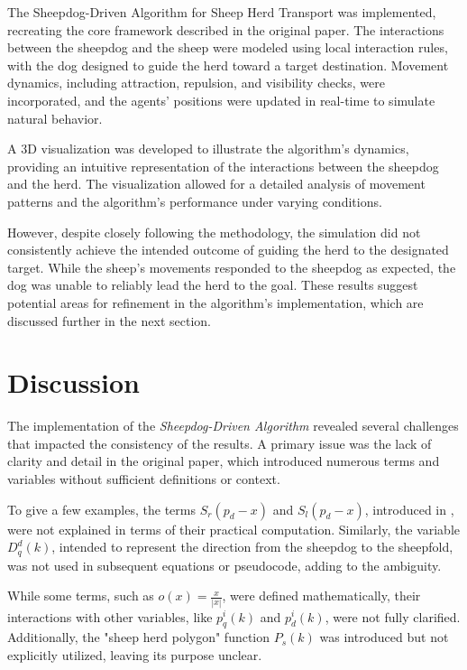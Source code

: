 \documentclass[9pt]{pnas-new}
\begin{document}
The Sheepdog-Driven Algorithm for Sheep Herd Transport was  implemented, recreating the core framework described in the original paper. The interactions between the sheepdog and the sheep were modeled using local interaction rules, with the dog designed to guide the herd toward a target destination. Movement dynamics, including attraction, repulsion, and visibility checks, were incorporated, and the agents' positions were updated in real-time to simulate natural behavior.

A 3D visualization was developed to illustrate the algorithm’s dynamics, providing an intuitive representation of the interactions between the sheepdog and the herd. The visualization allowed for a detailed analysis of movement patterns and the algorithm’s performance under varying conditions.

However, despite closely following the methodology, the simulation did not consistently achieve the intended outcome of guiding the herd to the designated target. While the sheep’s movements responded to the sheepdog as expected, the dog was unable to reliably lead the herd to the goal. These results suggest potential areas for refinement in the algorithm’s implementation, which are discussed further in the next section.





\section*{Discussion}

The implementation of the \textit{Sheepdog-Driven Algorithm} revealed several challenges that impacted the consistency of the results. A primary issue was the lack of clarity and detail in the original paper, which introduced numerous terms and variables without sufficient definitions or context.

To give a few examples, the terms \(S_r(p_d - x)\) and \(S_l(p_d - x)\), introduced in \cite{liu2021}, were not explained in terms of their practical computation. Similarly, the variable \(D_q^d(k)\), intended to represent the direction from the sheepdog to the sheepfold, was not used in subsequent equations or pseudocode, adding to the ambiguity.

While some terms, such as \(o(x) = \frac{x}{|x|}\), were defined mathematically, their interactions with other variables, like \(p_q^i(k)\) and \(p_d^i(k)\), were not fully clarified. Additionally, the "sheep herd polygon" function \(P_s(k)\) was introduced but not explicitly utilized, leaving its purpose unclear.
\end{document}
